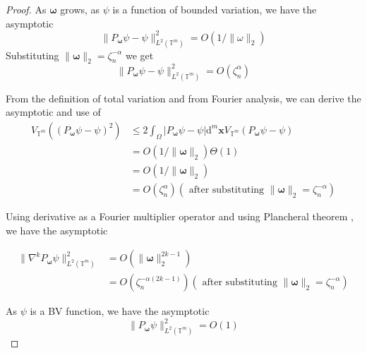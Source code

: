 \documentclass[multixcb]{amstext-l}
\theoremstyle{plain}
\theoremstyle{definition}
\theoremstyle{definition}
\theoremstyle{remark}
\numberwithin{equation}{chapter}
\begin{document}
\begin{proof}
As $\boldsymbol{\omega}$ grows, as $\psi$ is a function of bounded variation, we have the asymptotic \cite{Zygmund1959} \begin{equation}\label{f_convergence}
    \|P_{\boldsymbol{\omega}}\psi-\psi\|^2_{L^2(\mathbb{T}^m)} = O(1/\|\omega\|_2)
\end{equation}
Substituting $\|\boldsymbol{\omega}\|_2 = \zeta_n^{-\alpha}$ we get \begin{equation}
    \|P_{\boldsymbol{\omega}}\psi-\psi\|^2_{L^2(\mathbb{T}^m)} = O(\zeta_n^{\alpha})
\end{equation}

From the definition of total variation and from Fourier analysis, we can derive the asymptotic \cite{ Zygmund1959, Tolstov1976, Katznelson_2004} and use of \cite{OpenAI2025ChatGPT}
\begin{equation}\label{tvar_error_asymp}
    \begin{aligned}
      V_{\mathbb{T}^m}((P_{\boldsymbol{\omega}}\psi-\psi)^2) &\le 2\int_{\Omega}|P_{\boldsymbol{\omega}}\psi-\psi|\mathrm{d}^m\boldsymbol{x} V_{\mathbb{T}^m}(P_{\boldsymbol{\omega}}\psi-\psi)\\
      &= O(1/\|\boldsymbol{\omega}\|_2) \Theta(1)\\
      &= O(1/\|\boldsymbol{\omega}\|_2)\\
      &= O(\zeta_n^{\alpha})( \mbox{ after substituting  }\|\boldsymbol{\omega}\|_2 = \zeta_n^{-\alpha})
    \end{aligned}
\end{equation} 

Using derivative as a Fourier multiplier operator and using Plancheral theorem , we have the asymptotic

\begin{equation}\label{kgrad_asymp}
\begin{aligned}
    \|\nabla^kP_{\boldsymbol{\omega}}\psi\|_{L^2(\mathbb{T}^m)}^2  &= O(\|\boldsymbol{\omega}\|_2^{2k-1})\\
    &= O(\zeta_n^{-\alpha(2k-1)})( \mbox{ after substituting  }\|\boldsymbol{\omega}\|_2 = \zeta_n^{-\alpha})
\end{aligned}
\end{equation} 

As $\psi$ is a BV function, we have the asymptotic 
\begin{equation}\label{norm_psum_asymp}
    \|P_{\boldsymbol{\omega}}\psi\|_{L^2(\mathbb{T}^m)}^2 = O(1)
\end{equation}


\end{proof}
\end{document}
